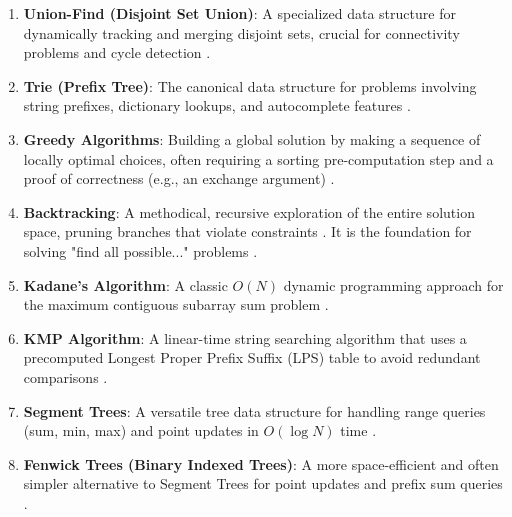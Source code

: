 \documentclass{article}
\begin{document}
\begin{enumerate}
\item \textbf{Union-Find (Disjoint Set Union)}: A specialized data structure for dynamically tracking and merging disjoint sets, crucial for connectivity problems and cycle detection \cite{25}.
\item \textbf{Trie (Prefix Tree)}: The canonical data structure for problems involving string prefixes, dictionary lookups, and autocomplete features \cite{26}.
\item \textbf{Greedy Algorithms}: Building a global solution by making a sequence of locally optimal choices, often requiring a sorting pre-computation step and a proof of correctness (e.g., an exchange argument) \cite{27}.
\item \textbf{Backtracking}: A methodical, recursive exploration of the entire solution space, pruning branches that violate constraints \cite{28}. It is the foundation for solving "find all possible..." problems \cite{29}.
\item \textbf{Kadane's Algorithm}: A classic $O(N)$ dynamic programming approach for the maximum contiguous subarray sum problem \cite{30}.
\item \textbf{KMP Algorithm}: A linear-time string searching algorithm that uses a precomputed Longest Proper Prefix Suffix (LPS) table to avoid redundant comparisons \cite{31}.
\item \textbf{Segment Trees}: A versatile tree data structure for handling range queries (sum, min, max) and point updates in $O(\log N)$ time \cite{32}.
\item \textbf{Fenwick Trees (Binary Indexed Trees)}: A more space-efficient and often simpler alternative to Segment Trees for point updates and prefix sum queries \cite{34, 33}.
\end{enumerate}
\end{document}
